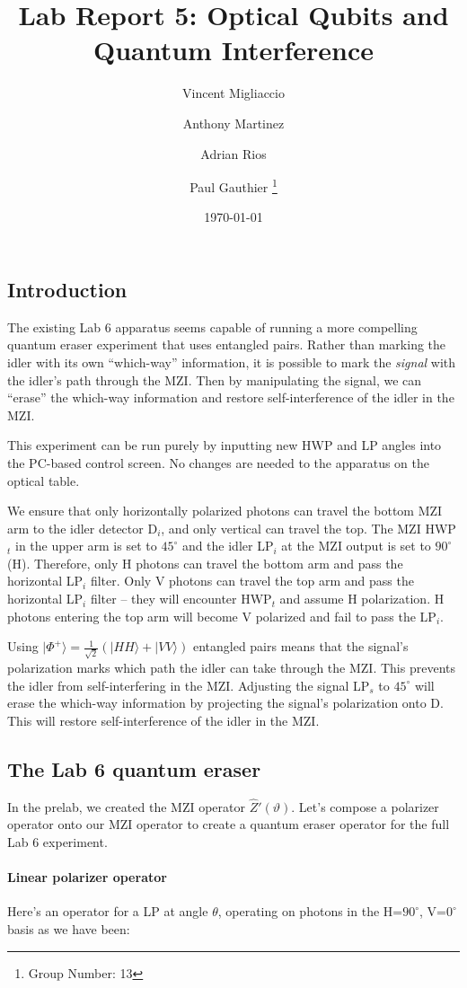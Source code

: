 \documentclass{article}
\title{Lab Report 5: Optical Qubits and Quantum Interference}
\author{
  Vincent Migliaccio \and
  Anthony Martinez \and
  Adrian Rios \and
  Paul Gauthier
  \thanks{Group Number: 13} \\
}
\date{\today}
\begin{document}


\subsection*{Introduction}

The existing Lab 6 apparatus seems capable of running a more compelling quantum
eraser experiment that uses entangled pairs.
Rather than marking the idler with its own ``which-way'' information, it is possible
to mark the \emph{signal} with the idler's path through the MZI.
Then by manipulating the signal, we can ``erase'' the which-way information
and restore self-interference of the idler in the MZI.

This experiment can be run purely by inputting new HWP and LP angles
into the PC-based control screen.
No changes are needed to the apparatus on the optical table.

We ensure that only horizontally polarized photons can travel the bottom MZI arm
to the idler detector D$_i$, and only vertical can travel the top.
The MZI HWP$_t$ in the upper arm is set to $45^\circ$ and the idler LP$_i$ at the
MZI output is set to $90^\circ$ (H).
Therefore, only H photons can travel the bottom arm
and pass the horizontal LP$_i$ filter.
Only V photons can travel the top arm and pass the horizontal LP$_i$ filter
-- they will encounter HWP$_t$ and assume H polarization.
H photons entering the top arm will become V polarized
and fail to pass the LP$_i$.

Using $| \Phi^+ \rangle = \frac{1}{\sqrt2}(|HH\rangle + |VV\rangle)$
entangled pairs means that the signal's polarization marks which
path the idler can take through the MZI.
This prevents the idler from self-interfering in the MZI.
Adjusting the signal LP$_s$ to $45^\circ$ will erase the which-way information
by projecting the signal's polarization onto D.
This will restore self-interference of the idler in the MZI.

\subsection*{The Lab 6 quantum eraser}

In the prelab, we created the MZI operator $\hat{Z}'(\vartheta)$.
Let's compose a polarizer operator onto our MZI operator
to create a quantum eraser operator for the full Lab 6 experiment.

\paragraph{Linear polarizer operator}
Here's an operator for a LP at angle $\theta$,
operating on photons in the H=$90^\circ$, V=$0^\circ$ basis as we have been:
\end{document}
